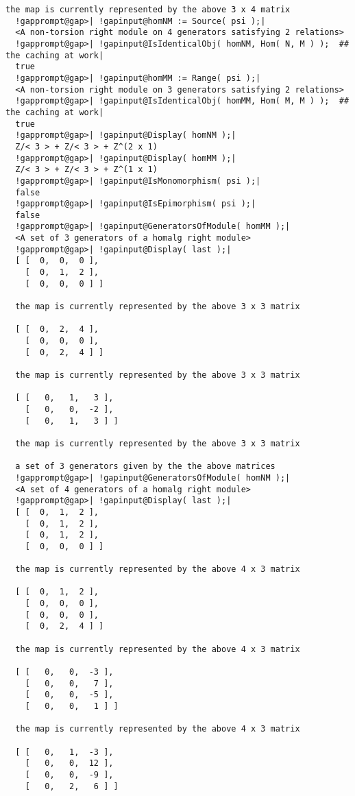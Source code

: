 \documentclass[a4paper,11pt]{report}
\begin{document}
{{{\begin{Verbatim}[commandchars=!@|,fontsize=\small,frame=single,label=Example]
  the map is currently represented by the above 3 x 4 matrix
  !gapprompt@gap>| !gapinput@homNM := Source( psi );|
  <A non-torsion right module on 4 generators satisfying 2 relations>
  !gapprompt@gap>| !gapinput@IsIdenticalObj( homNM, Hom( N, M ) );	## the caching at work|
  true
  !gapprompt@gap>| !gapinput@homMM := Range( psi );|
  <A non-torsion right module on 3 generators satisfying 2 relations>
  !gapprompt@gap>| !gapinput@IsIdenticalObj( homMM, Hom( M, M ) );	## the caching at work|
  true
  !gapprompt@gap>| !gapinput@Display( homNM );|
  Z/< 3 > + Z/< 3 > + Z^(2 x 1)
  !gapprompt@gap>| !gapinput@Display( homMM );|
  Z/< 3 > + Z/< 3 > + Z^(1 x 1)
  !gapprompt@gap>| !gapinput@IsMonomorphism( psi );|
  false
  !gapprompt@gap>| !gapinput@IsEpimorphism( psi );|
  false
  !gapprompt@gap>| !gapinput@GeneratorsOfModule( homMM );|
  <A set of 3 generators of a homalg right module>
  !gapprompt@gap>| !gapinput@Display( last );|
  [ [  0,  0,  0 ],
    [  0,  1,  2 ],
    [  0,  0,  0 ] ]
  
  the map is currently represented by the above 3 x 3 matrix
  
  [ [  0,  2,  4 ],
    [  0,  0,  0 ],
    [  0,  2,  4 ] ]
  
  the map is currently represented by the above 3 x 3 matrix
  
  [ [   0,   1,   3 ],
    [   0,   0,  -2 ],
    [   0,   1,   3 ] ]
  
  the map is currently represented by the above 3 x 3 matrix
  
  a set of 3 generators given by the the above matrices
  !gapprompt@gap>| !gapinput@GeneratorsOfModule( homNM );|
  <A set of 4 generators of a homalg right module>
  !gapprompt@gap>| !gapinput@Display( last );|
  [ [  0,  1,  2 ],
    [  0,  1,  2 ],
    [  0,  1,  2 ],
    [  0,  0,  0 ] ]
  
  the map is currently represented by the above 4 x 3 matrix
  
  [ [  0,  1,  2 ],
    [  0,  0,  0 ],
    [  0,  0,  0 ],
    [  0,  2,  4 ] ]
  
  the map is currently represented by the above 4 x 3 matrix
  
  [ [   0,   0,  -3 ],
    [   0,   0,   7 ],
    [   0,   0,  -5 ],
    [   0,   0,   1 ] ]
  
  the map is currently represented by the above 4 x 3 matrix
  
  [ [   0,   1,  -3 ],
    [   0,   0,  12 ],
    [   0,   0,  -9 ],
    [   0,   2,   6 ] ]
  

\end{Verbatim}}}}
\end{document}

